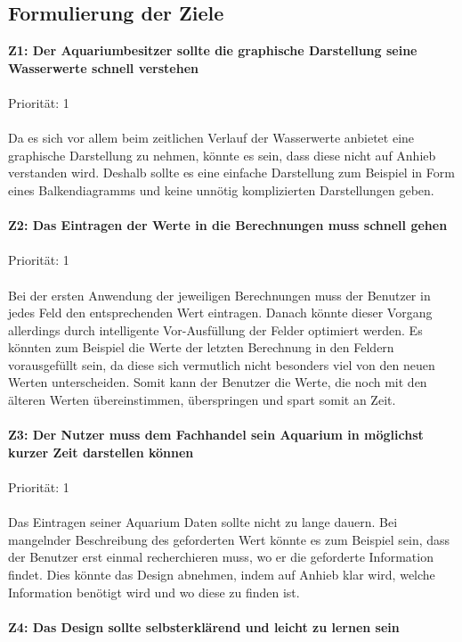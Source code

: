 \subsection{Formulierung der Ziele}
\textbf{Z1: Der Aquariumbesitzer sollte die graphische Darstellung seine Wasserwerte schnell verstehen}
\\ \\
Priorität: 1
\\ \\
Da es sich vor allem beim zeitlichen Verlauf der Wasserwerte anbietet eine graphische Darstellung zu nehmen, könnte es sein, dass diese nicht auf Anhieb verstanden wird. Deshalb sollte es eine einfache Darstellung zum Beispiel in Form eines Balkendiagramms und keine unnötig komplizierten Darstellungen geben.
\\ \\
\textbf{Z2: Das Eintragen der Werte in die Berechnungen muss schnell gehen}
\\ \\
Priorität: 1
\\ \\
Bei der ersten Anwendung der jeweiligen Berechnungen muss der Benutzer in jedes Feld den entsprechenden Wert eintragen. Danach könnte dieser Vorgang allerdings durch intelligente Vor-Ausfüllung der Felder optimiert werden. Es könnten zum Beispiel die Werte der letzten Berechnung in den Feldern vorausgefüllt sein, da diese sich vermutlich nicht besonders viel von den neuen Werten unterscheiden. Somit kann der Benutzer die Werte, die noch mit den älteren Werten übereinstimmen, überspringen und spart somit an Zeit.
\\ \\
\textbf{Z3: Der Nutzer muss dem Fachhandel sein Aquarium in möglichst kurzer Zeit darstellen können}
\\ \\
Priorität: 1
\\ \\
Das Eintragen seiner Aquarium Daten sollte nicht zu lange dauern. Bei mangelnder Beschreibung des geforderten Wert könnte es zum Beispiel sein, dass der Benutzer erst einmal recherchieren muss, wo er die geforderte Information findet. Dies könnte das Design abnehmen, indem auf Anhieb klar wird, welche Information benötigt wird und wo diese zu finden ist.
\\ \\
\textbf{Z4: Das Design sollte selbsterklärend und leicht zu lernen sein}
\\ \\
